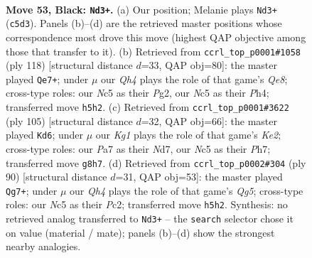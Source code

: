 \documentclass[11pt]{article}
\begin{document}
\clearpage

\begin{figure}[p]\centering
\begin{subfigure}{0.46\textwidth}\centering
\resizebox{\linewidth}{!}{%
\newchessgame
\chessboard[
  setfen={6k1/p7/1p6/2n1Qp1q/P1p5/6P1/1P3K2/R7 b - - 0 53},
  showmover=false,
  pgfstyle=straightmove, color=movearrow, markmove={c5-d3}
]}
\caption{}
\end{subfigure}\hfill
\begin{subfigure}{0.46\textwidth}\centering
\resizebox{\linewidth}{!}{%
\newchessgame
\chessboard[
  setfen={4Q3/6k1/3r2pp/8/3N1PqP/2P5/6PK/8 w - - 5 60},
  showmover=false,
  pgfstyle=straightmove, color=movearrow, markmove={e8-e7}
]}
\caption{}
\end{subfigure}
\\[4pt]
\begin{subfigure}{0.46\textwidth}\centering
\resizebox{\linewidth}{!}{%
\newchessgame
\chessboard[
  setfen={8/1n1nk2p/b5pQ/P4p2/4p3/7P/6PK/8 b - - 5 53},
  showmover=false,
  pgfstyle=straightmove, color=movearrow, markmove={e7-d6}
]}
\caption{}
\end{subfigure}\hfill
\begin{subfigure}{0.46\textwidth}\centering
\resizebox{\linewidth}{!}{%
\newchessgame
\chessboard[
  setfen={8/3k4/3p4/ppqP2Q1/8/1P6/2P5/1K6 w - - 0 46},
  showmover=false,
  pgfstyle=straightmove, color=movearrow, markmove={g5-g7}
]}
\caption{}
\end{subfigure}
\caption{\textbf{Move 53, Black: \texttt{Nd3+}.} (a) Our position; Melanie plays \texttt{Nd3+} (\texttt{c5d3}). Panels (b)--(d) are the retrieved master positions whose correspondence most drove this move (highest QAP objective among those that transfer to it). (b) Retrieved from \texttt{ccrl\_top\_p0001\#1058} (ply 118) [structural distance $d$=33, QAP obj=80]: the master played \texttt{Qe7+}; under $\mu$ our \emph{Qh4} plays the role of that game's \emph{Qe8}; cross-type roles: our \emph{N}c5 as their \emph{P}g2, our \emph{N}c5 as their \emph{P}h4; transferred move \texttt{h5h2}. (c) Retrieved from \texttt{ccrl\_top\_p0001\#3622} (ply 105) [structural distance $d$=32, QAP obj=66]: the master played \texttt{Kd6}; under $\mu$ our \emph{Kg1} plays the role of that game's \emph{Ke2}; cross-type roles: our \emph{P}a7 as their \emph{N}d7, our \emph{N}c5 as their \emph{P}h7; transferred move \texttt{g8h7}. (d) Retrieved from \texttt{ccrl\_top\_p0002\#304} (ply 90) [structural distance $d$=31, QAP obj=53]: the master played \texttt{Qg7+}; under $\mu$ our \emph{Qh4} plays the role of that game's \emph{Qg5}; cross-type roles: our \emph{N}c5 as their \emph{P}c2; transferred move \texttt{h5h2}. Synthesis: no retrieved analog transferred to \texttt{Nd3+} -- the \texttt{search} selector chose it on value (material / mate); panels (b)--(d) show the strongest nearby analogies.}
\label{fig:thought-m105}
\end{figure}
\end{document}
